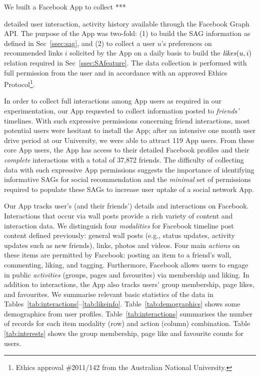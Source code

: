 
We built a Facebook App to collect ***

 detailed user interaction,
activity history available through the Facebook Graph API.  The
purpose of the App was two-fold: (1) to build the SAG information as
defined in Sec~\ref{ssec:sag}, and (2) to collect a user $u$'s preferences on
recommended links $i$ solicited by the App on a daily basis to build
the $\likes(u,i)$ relation required in Sec~\ref{ssec:SAfeature}.  The
data collection is performed with full permission from the user and in
accordance with an approved Ethics Protocol\footnote{Ethics approval 
\#2011/142 from the Australian National University.}.

In order to collect full interactions among App users as required in
our experimentation, our App requested to collect information posted
to \emph{friends'} timelines.  With such expressive permissions
concerning friend interactions, most potential users were hesitant to
install the App; after an intensive one month user drive period at our
University, we were able to attract 119 App users.  From these core
App users, the App has access to their detailed Facebook profiles and
their \emph{complete} interactions with a total of 37,872 friends.
The difficulty of collecting data with such expressive App permissions
suggests the importance of identifying informative SAGs for social
recommendation and the \emph{minimal} set of permissions required to
populate these SAGs to increase user uptake of a social network 
App.

Our App tracks user's (and their friends') details and interactions on
Facebook.  Interactions that occur via wall posts provide a rich
variety of content and interaction data.  We distinguish
four \emph{modalities} for Facebook timeline post content defined previously:
general wall posts (e.g., status updates, activity updates such as new
friends), links, photos and videos. Four main \emph{actions} on these
items are permitted by Facebook: posting an item to a friend's wall,
commenting, liking, and tagging. Furthermore, Facebook allows users to
engage in public \emph{activities} (groups, pages and favourites) via membership
and liking. In addition to interactions, the App also tracks users'
group membership, page likes, and favourites.
We summarise relevant basic statistics of the data in
Tables~\ref{tab:interactions}--\ref{tab:likeinfo}.
Table~\ref{tab:demographics} shows some demographics from user
profiles.  Table~\ref{tab:interactions} summarises the number of
records for each item modality (row) and action (column)
combination. Table \ref{tab:interests} shows the group membership,
page like and favourite counts for users.

